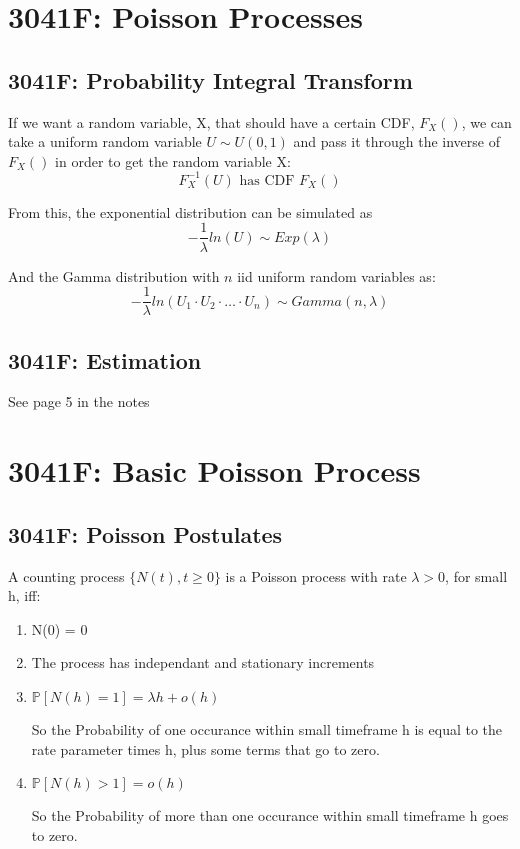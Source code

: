 \section{3041F: Poisson Processes}
\subsection{3041F: Probability Integral Transform}
If we want a random variable, X, that should have a certain CDF, \(F_X()\),
we can take a uniform random variable \(U \sim U(0, 1)\) and 
pass it through the inverse of \(F_X()\) in order to get the random variable X:
\begin{equation*}
    F_X^{-1}(U) \text{ has CDF } F_X()
\end{equation*}


From this, the exponential distribution can be simulated as 
\begin{equation*}
    -\frac{1}{\lambda}ln(U) \sim Exp(\lambda)
\end{equation*}

And the Gamma distribution with \(n\) iid uniform random variables as:
\begin{equation*}
    -\frac{1}{\lambda}ln(U_1 \cdot U_2 \cdot \dots \cdot U_n) \sim Gamma(n, \lambda)
\end{equation*}

\subsection{3041F: Estimation}
See page 5 in the notes
\section{3041F: Basic Poisson Process}
\subsection{3041F: Poisson Postulates}
A counting process \(\{N(t), t \ge 0\}\) is a Poisson process with rate 
\( \lambda > 0 \), for small h, iff:
\begin{enumerate}
    \item N(0) = 0
    \item The process has independant and stationary increments
    \item \(\mathbb{P}[N(h) = 1] = \lambda h + o(h)\)

        So the Probability of one occurance within small timeframe h is equal to the rate parameter times h, plus some terms that go to zero.
    \item \(\mathbb{P}[N(h) > 1] = o(h)\)

        So the Probability of more than one occurance within small timeframe h goes to zero.
\end{enumerate}

